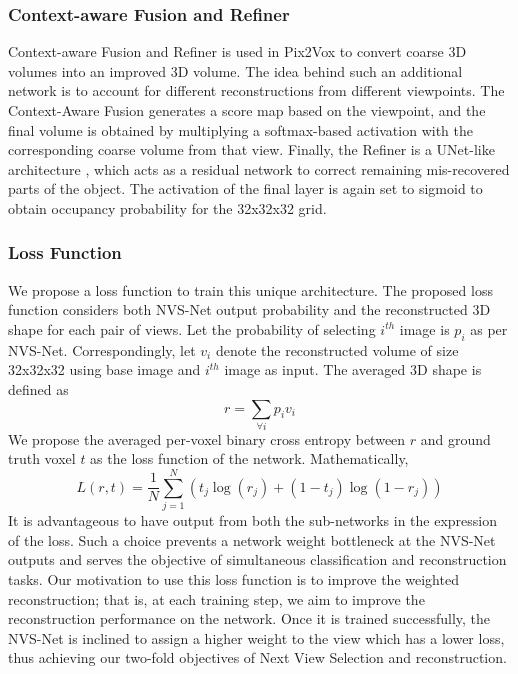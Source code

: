 \subsubsection{Context-aware Fusion and Refiner}
Context-aware Fusion and Refiner is used in Pix2Vox \cite{pix2vox}  to convert coarse 3D volumes into an improved 3D volume. The idea behind such an additional network is to account for different reconstructions from different viewpoints. The Context-Aware Fusion generates a score map based on the viewpoint, and the final volume is obtained by multiplying a softmax-based activation with the corresponding coarse volume from that view. Finally, the Refiner is a UNet-like architecture \cite{unet}, which acts as a residual network to correct remaining mis-recovered parts of the object. The activation of the final layer is again set to sigmoid to obtain occupancy probability for the 32x32x32 grid.
\subsubsection{Loss Function}
We propose a loss function to train this unique architecture. The proposed loss function considers both NVS-Net output probability and the reconstructed 3D shape for each pair of views. Let the probability of selecting $i^{th}$ image is $p_i$ as per NVS-Net. Correspondingly, let $v_i$ denote the reconstructed volume of size 32x32x32 using base image and $i^{th}$ image as input. The averaged 3D shape is defined as 
\begin{equation}
    r = \sum_{\forall i} p_i v_i
\end{equation}
We propose the averaged per-voxel binary cross entropy between $r$ and ground truth voxel $t$ as the loss function of the network. Mathematically,
\begin{equation}
    L(r, t) = \frac{1}{N} \sum_{j=1}^{N} (t_j\log(r_j) + (1-t_j)\log(1-r_j))
\end{equation}
It is advantageous to have output from both the sub-networks in the expression of the loss. Such a choice prevents a network weight bottleneck at the NVS-Net outputs and serves the objective of simultaneous classification and reconstruction tasks. Our motivation to use this loss function is to improve the weighted reconstruction; that is, at each training step, we aim to improve the reconstruction performance on the network. Once it is trained successfully, the NVS-Net is inclined to assign a higher weight to the view which has a lower loss, thus achieving our two-fold objectives of Next View Selection and reconstruction.

